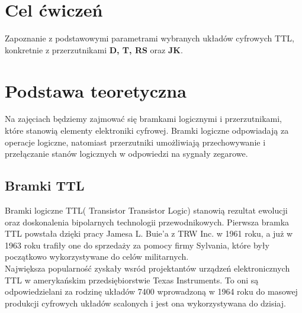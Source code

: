 \documentclass{article}
\begin{document}
\section{Cel ćwiczeń}

Zapoznanie z podstawowymi parametrami wybranych układów cyfrowych TTL, konkretnie z przerzutnikami \textbf{ D, T, RS} oraz \textbf{JK}.

\section{Podstawa teoretyczna}
    Na zajęciach będziemy zajmować się bramkami logicznymi i przerzutnikami, które stanowią elementy elektroniki cyfrowej. Bramki logiczne odpowiadają za operacje logiczne, natomiast przerzutniki umożliwiają przechowywanie i przełączanie stanów logicznych w odpowiedzi na sygnały zegarowe.

    \subsection{Bramki TTL}
    Bramki logiczne TTL( Transistor Transistor Logic) stanowią rezultat ewolucji oraz doskonalenia bipolarnych technologii przewodnikowych. 
    Pierwsza bramka TTL powstała dzięki pracy Jamesa L. Buie'a z TRW Inc. w 1961 roku, a już w 1963 roku trafiły one do sprzedaży za pomocy firmy Sylvania, które były początkowo wykorzystywane do celów militarnych\cite{maciak,wiki}.\\
   
    Największa popularność zyskały wsród projektantów urządzeń elektronicznych TTL w amerykańskim przedsiębiorstwie Texas Instruments. To oni są odpowiedzielani za rodzinę układów 7400 wprowadzoną w 1964 roku do masowej produkcji cyfrowych układów scalonych i jest ona wykorzystywana do dzisiaj\cite{maciak,wiki,TI7400}. \\
    
\end{document}
